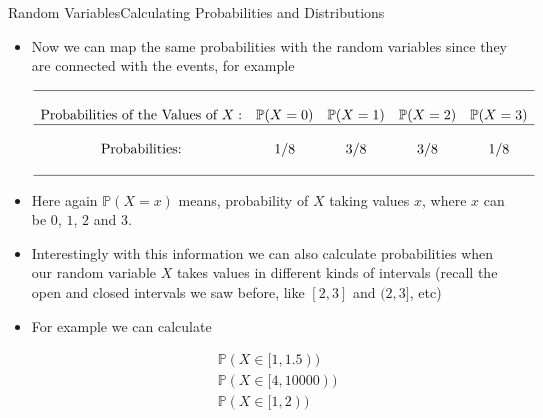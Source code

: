 \documentclass[8pt, usepdftitle = false]{beamer}
\begin{document}
\begin{frame}[allowframebreaks]{Random Variables}{Calculating Probabilities and Distributions}
\begin{itemize}
\item Now we can map the same probabilities with the random variables since they are connected with the events, for example 

\begin{align*}
\begin{array}{ccccc}
\hline \\
\text{Probabilities of the Values of } X:& \mathbb{P}(X=0)  & \mathbb{P}(X=1) & \mathbb{P}(X=2) & \mathbb{P}(X=3) \\
\hline \\
 \text{Probabilities:} & 1/8 & 3/8 & 3/8 & 1/8 \\
\\
\hline
\end{array}
\end{align*}


\item Here again $ \mathbb{P}(X=x)$ means, probability of $X$ taking values $x$, where $x$ can be $0$, $1$, $2$ and $3$. 









\framebreak


\item Interestingly with this information we can also calculate probabilities when our random variable $X$ takes values in different kinds of intervals (recall the open and closed intervals we saw before, like $[2, 3]$ and $(2, 3]$, etc) 

\item For example we can calculate 




\begin{align*}
	&\mathbb{P}(X \in [1, 1.5)) \\
	&\mathbb{P}(X \in [4, 10000)) \\
	&\mathbb{P}( X \in [1, 2)) \\
\end{align*}






\end{itemize}
\end{frame}
\end{document}
